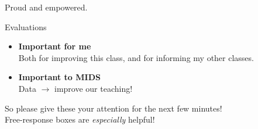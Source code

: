 \documentclass[11pt]{beamer}
\begin{document}
\begin{frame}[c]{}
\centering
     \alert{Proud} and \alert{empowered}.
\end{frame}

\begin{frame}[c]{Evaluations}
\begin{itemize}
  \pause \item \textbf{Important for me} \\
  \pause Both for improving this class, and for informing my other classes.
  \pause \item \textbf{Important to MIDS} \\
  Data $\rightarrow$ improve our teaching!
\end{itemize}
\pause So please give these your attention for the next few minutes! \\
\pause Free-response boxes are \emph{especially} helpful!
\end{frame}
\end{document}

